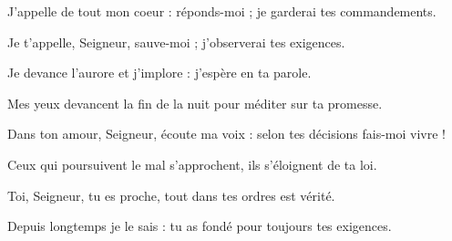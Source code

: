 \item J'appelle de tout mon coeur : réponds-moi ; je garderai tes commandements.

\item Je t'appelle, Seigneur, sauve-moi ; j'observerai tes exigences.

\item Je devance l'aurore et j'implore : j'espère en ta parole.

\item Mes yeux devancent la fin de la nuit pour méditer sur ta promesse.

\item Dans ton amour, Seigneur, écoute ma voix : selon tes décisions fais-moi vivre !

\item Ceux qui poursuivent le mal s'approchent, ils s'éloignent de ta loi.

\item Toi, Seigneur, tu es proche, tout dans tes ordres est vérité.

\item Depuis longtemps je le sais : tu as fondé pour toujours tes exigences.
